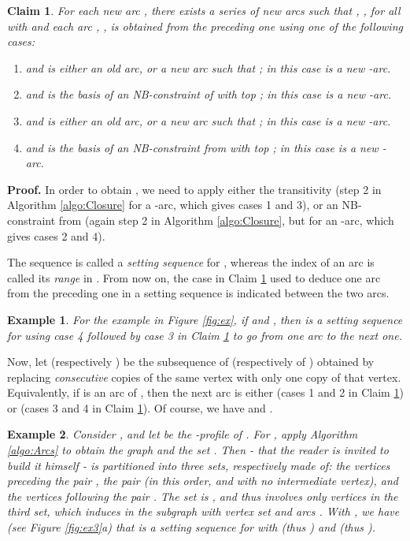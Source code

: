 \documentclass{article}
\newtheorem{fait}{Claim}
\newtheorem{ex}{Example}
\newcommand{\bex}{\begin{ex}\rm}
\newcommand{\eex}{\end{ex}}
\newcommand{\bfn}{\begin{fait}}
\newcommand{\efn}{\end{fait}}
\begin{document}
\bfn
For each new arc , there exists a series of new arcs   such that  ,  ,  for all  with  
and each arc , , is obtained from the preceding one  using one of the following cases:

\begin{enumerate}
\item  and  is either an old arc, or a new arc such that ; in this case  is a new -arc.
\item   and  is the basis of an NB-constraint of  
with top ; in this case  is a new -arc.
\item  and  is either an old arc,  or a new arc such that
; in  this case  is a new -arc.
\item   
and  is the basis of an NB-constraint from  with top ;
in this case  is a new -arc.
\end{enumerate}
\label{claim:imminduce}

\efn  



{\bf Proof.} In order to obtain  , we need to apply either the transitivity
(step 2 in Algorithm \ref{algo:Closure} for a -arc,  which gives cases 1 and 3), or an NB-constraint from 
(again step 2 in Algorithm \ref{algo:Closure}, but for an -arc, which gives cases 2 and 4). 
  
\bigskip



The sequence  is called a {\em setting sequence} for , whereas the index 
of an arc  is called its {\em range} in . From now on, the
case in Claim \ref{claim:imminduce} used to deduce one arc from the preceding one in a setting sequence 
is  indicated between the two arcs.

\bex
For the example in Figure \ref{fig:ex}, if  and , then 
is a setting sequence for  using case 4 followed by case 3 in Claim \ref{claim:imminduce} to go
from one arc to the next one. 
\label{ex:U}
\eex

Now, let  (respectively  
  ) be the subsequence of  
(respectively of ) obtained by replacing  {\em consecutive} 
copies of the same vertex with only one copy of that vertex. Equivalently, if  is 
an arc of , then the next arc is either   (cases 1 and 2 in 
Claim \ref{claim:imminduce}) or  (cases 3 and 4 in Claim
\ref{claim:imminduce}). Of course, we have  and .
 

\bex
Consider ,
and let  be the -profile of . For , apply Algorithm \ref{algo:Arcs} to obtain the
graph  and the set .  Then  - that the reader is invited to build it himself - is partitioned into three sets, respectively made of:
the vertices preceding the pair , the pair  (in this order, and with no intermediate vertex),
and the  vertices following the pair . The set  is , and thus
involves only vertices in the third set, which induces in
 the subgraph  with vertex set  and arcs
.
With , 
we have (see Figure \ref{fig:ex3}a) that  is a setting sequence
for  with  (thus ) and  (thus ).
\label{ex:HU}
\eex
\end{document}
